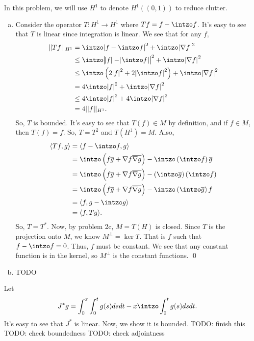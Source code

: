 \documentclass{article}
\newcommand{\D}{\nabla}
\begin{document}
\newpage
{} 
 \tri
\hop 
\solution
In this problem, we will use $H^1$ to denote $H^1((0,1))$ to reduce clutter.
\begin{enumerate}[(a)]
    \item Consider the operator $T: H^1 \to H^1$ where $Tf = f - \intzo f$. It's easy to see that $T$ is linear since integration is linear. We see that for any $f$, %
    \begin{align*}
        ||Tf||_{H^1} &= \intzo \abs{f - \intzo f}^2 + \intzo \abs{\D f}^2 \\
        &\le  \intzo \abs{\abs{f} - \abs{\intzo f}}^2 + \intzo \abs{\D f} ^2\\
        &\le  \intzo \del{2\abs{f}^2 +2 \abs{\intzo f}^2} + \intzo \abs{\D f}^2 \\
        &=  4\intzo \abs{f}^2 + \intzo \abs{\D f}^2 \\
        &\le  4\intzo \abs{f}^2 + 4\intzo \abs{\D f}^2 \\
        &= 4||f||_{H^1}.
    \end{align*}
    So, $T$ is bounded. It's easy to see that $T(f) \in M$ by definition, and if $f \in M$, then $T(f) = f$. So, $T = T^2$ and $T(H^1) = M$. Also, 
    \begin{align*}
        \ang{Tf, g} &= \ang{f-\intzo f, g } \\ 
        &= \intzo \del{f \ol{g} + \D f \ol{\D g}} - \intzo \del{\intzo f}\ol{g} \\
        &= \intzo \del{f \ol{g} + \D f \ol{\D g}} - \del{\intzo\ol{g}} \del{\intzo f} \\
        &= \intzo \del{f \ol{g} + \D f \ol{\D g}} - \intzo \del{\intzo \ol{g}}f \\
        &=\ang{f, g - \intzo g} \\
        &= \ang{f, Tg}.
    \end{align*}
    So, $T = T^*$. Now, by problem 2c, $M = T(H)$ is closed. 
    \hop 
    Since $T$ is the projection onto $M$, we know $M^\perp = \ker T$. That is $f$ such that $f - \intzo f = 0$. Thus, $f$ must be constant. We see that any constant function is in the kernel, so $M^\perp$ is the constant functions. \qed
    \item TODO
\end{enumerate}

\newpage
{} 
 \tri
\hop 
\solution
Let 
\[J^*g = \int_0^x\int_0^t g(s)dsdt - x\intzo\int_0^t g(s)ds dt. \]
It's easy to see that $J^*$ is linear. Now, we show it is bounded.
TODO: finish this
TODO: check boundedness
TODO: check adjointness
\end{document}
